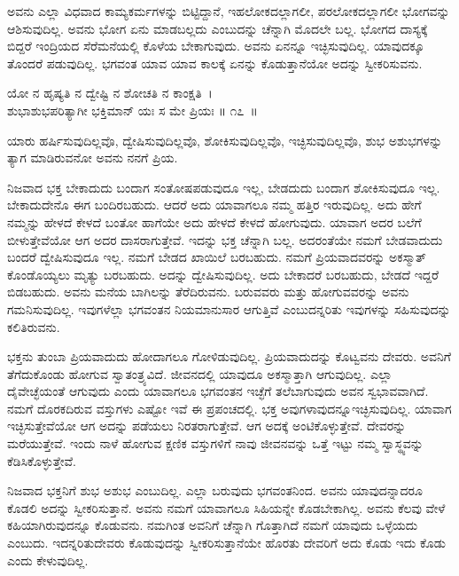 ಅವನು ಎಲ್ಲಾ ವಿಧವಾದ ಕಾಮ್ಯಕರ್ಮಗಳನ್ನು ಬಿಟ್ಟಿದ್ದಾನೆ, ಇಹಲೋಕದಲ್ಲಾಗಲೀ, ಪರ\-ಲೋಕದಲ್ಲಾಗಲೀ ಭೋಗವನ್ನು ಆಶಿಸುವುದಿಲ್ಲ. ಅವನು ಭೋಗ ಏನು ಮಾಡಬಲ್ಲದು ಎಂಬು\-ದನ್ನು ಚೆನ್ನಾಗಿ ಮೊದಲೇ ಬಲ್ಲ. ಭೋಗದ ದಾಸ್ಯಕ್ಕೆ ಬಿದ್ದರೆ ಇಂದ್ರಿಯದ ಸೆರೆಮನೆಯಲ್ಲಿ ಕೊಳೆಯ ಬೇಕಾಗುವುದು. ಅವನು ಏನನ್ನೂ ಇಚ್ಛಿಸುವುದಿಲ್ಲ. ಯಾವುದಕ್ಕೂ ತೊಂದರೆ ಪಡುವುದಿಲ್ಲ. ಭಗವಂತ ಯಾವ ಯಾವ ಕಾಲಕ್ಕೆ ಏನನ್ನು ಕೊಡುತ್ತಾನೆಯೋ ಅದನ್ನು ಸ್ವೀಕರಿಸುವನು.

\begin{shloka}
ಯೋ ನ ಹೃಷ್ಯತಿ ನ ದ್ವೇಷ್ಟಿ ನ ಶೋಚತಿ ನ ಕಾಂಕ್ಷತಿ~।\\ಶುಭಾಶುಭಪರಿತ್ಯಾಗೀ ಭಕ್ತಿಮಾನ್ ಯಃ ಸ ಮೇ ಪ್ರಿಯಃ \hfill॥ ೧೭~॥
\end{shloka}

\begin{artha}
ಯಾರು ಹರ್ಷಿಸುವುದಿಲ್ಲವೊ, ದ್ವೇಷಿಸುವುದಿಲ್ಲವೊ, ಶೋಕಿಸುವುದಿಲ್ಲವೊ, ಇಚ್ಛಿಸುವುದಿಲ್ಲವೊ, ಶುಭ ಅಶುಭಗಳನ್ನು ತ್ಯಾಗ ಮಾಡಿರುವನೋ ಅವನು ನನಗೆ ಪ್ರಿಯ.
\end{artha}

ನಿಜವಾದ ಭಕ್ತ ಬೇಕಾದುದು ಬಂದಾಗ ಸಂತೋಷಪಡುವುದೂ ಇಲ್ಲ, ಬೇಡದುದು ಬಂದಾಗ ಶೋಕಿಸುವುದೂ ಇಲ್ಲ. ಬೇಕಾದುದೇನೊ ಈಗ ಬಂದಿರಬಹುದು. ಆದರೆ ಅದು ಯಾವಾಗಲೂ ನಮ್ಮ ಹತ್ತಿರ ಇರುವುದಿಲ್ಲ. ಅದು ಹೇಗೆ ನಮ್ಮನ್ನು ಹೇಳದೆ ಕೇಳದೆ ಬಂತೋ ಹಾಗೆಯೇ ಅದು ಹೇಳದೆ ಕೇಳದೆ ಹೋಗುವುದು. ಯಾವಾಗ ಅದರ ಬಲೆಗೆ ಬೀಳುತ್ತೇವೆಯೋ ಆಗ ಅದರ ದಾಸರಾಗುತ್ತೇವೆ. ಇದನ್ನು ಭಕ್ತ ಚೆನ್ನಾಗಿ ಬಲ್ಲ. ಅದರಂತೆಯೇ ನಮಗೆ ಬೇಡವಾದುದು ಬಂದರೆ ದ್ವೇಷಿಸುವುದೂ ಇಲ್ಲ. ನಮಗೆ ಬೇಡದ ಖಾಯಿಲೆ ಬರಬಹುದು. ನಮಗೆ ಪ್ರಿಯವಾದವರನ್ನು ಅಕಸ್ಮಾತ್ ಕೊಂಡೊಯ್ಯಲು ಮೃತ್ಯು ಬರಬಹುದು. ಅದನ್ನು ದ್ವೇಷಿಸುವುದಿಲ್ಲ. ಅದು ಬೇಕಾದರೆ ಬರಬಹುದು, ಬೇಡದೆ ಇದ್ದರೆ ಬಿಡಬಹುದು. ಅವನು ಮನೆಯ ಬಾಗಿಲನ್ನು ತೆರೆದಿರುವನು. ಬರುವವರು ಮತ್ತು ಹೋಗುವವರನ್ನು ಅವನು ಗಮನಿಸುವುದಿಲ್ಲ. ಇವುಗಳೆಲ್ಲಾ ಭಗವಂತನ ನಿಯಮಾನುಸಾರ ಆಗುತ್ತಿವೆ ಎಂಬುದನ್ನರಿತು ಇವುಗಳನ್ನು ಸಹಿಸುವುದನ್ನು ಕಲಿತಿರುವನು.

ಭಕ್ತನು ತುಂಬಾ ಪ್ರಿಯವಾದುದು ಹೋದಾಗಲೂ ಗೋಳಿಡುವುದಿಲ್ಲ. ಪ್ರಿಯವಾದುದನ್ನು ಕೊಟ್ವವನು ದೇವರು. ಅವನಿಗೆ ತೆಗೆದುಕೊಂಡು ಹೋಗುವ ಸ್ವಾತಂತ್ರ್ಯವಿದೆ. ಜೀವನದಲ್ಲಿ ಯಾವುದೂ ಅಕಸ್ಮಾತ್ತಾಗಿ ಆಗುವುದಿಲ್ಲ. ಎಲ್ಲಾ ದೈವೇಚ್ಛೆಯಂತೆ ಆಗುವುದು ಎಂದು ಯಾವಾಗಲೂ ಭಗವಂತನ ಇಚ್ಛೆಗೆ ತಲೆಬಾಗುವುದು ಅವನ ಸ್ವಭಾವವಾಗಿದೆ. ನಮಗೆ ದೊರಕ\-ದಿರುವ ವಸ್ತುಗಳು ಎಷ್ಟೋ ಇವೆ ಈ ಪ್ರಪಂಚದಲ್ಲಿ. ಭಕ್ತ ಅವುಗಳಾವುದನ್ನೂಇಚ್ಛಿಸುವುದಿಲ್ಲ. ಯಾವಾಗ ಇಚ್ಛಿಸುತ್ತೇವೆಯೋ ಆಗ ಅದನ್ನು ಪಡೆಯಲು ನಿರತರಾಗುತ್ತೇವೆ. ಆಗ ಅದಕ್ಕೆ ಅಂಟಿಕೊಳ್ಳುತ್ತೇವೆ. ದೇವರನ್ನು ಮರೆಯುತ್ತೇವೆ. ಇಂದು ನಾಳೆ ಹೋಗುವ ಕ್ಷಣಿಕ ವಸ್ತುಗಳಿಗೆ ನಾವು ಜೀವನವನ್ನು ಒತ್ತೆ ಇಟ್ಟು ನಮ್ಮ ಸ್ವಾಸ್ಥ್ಯವನ್ನು ಕೆಡಿಸಿಕೊಳ್ಳುತ್ತೇವೆ.

ನಿಜವಾದ ಭಕ್ತನಿಗೆ ಶುಭ ಅಶುಭ ಎಂಬುದಿಲ್ಲ. ಎಲ್ಲಾ ಬರುವುದು ಭಗವಂತನಿಂದ. ಅವನು ಯಾವುದನ್ನಾದರೂ ಕೊಡಲಿ ಅದನ್ನು ಸ್ವೀಕರಿಸುತ್ತಾನೆ. ಅವನು ನಮಗೆ ಯಾವಾಗಲೂ ಸಿಹಿಯನ್ನೇ ಕೊಡಬೇಕಾಗಿಲ್ಲ. ಅವನು ಕೆಲವು ವೇಳೆ ಕಹಿಯಾಗಿರುವುದನ್ನೂ ಕೊಡುವನು. ನಮಗಿಂತ ಅವನಿಗೆ ಚೆನ್ನಾಗಿ ಗೊತ್ತಾಗಿದೆ ನಮಗೆ ಯಾವುದು ಒಳ್ಳೆಯದು ಎಂಬುದು. ಇದನ್ನರಿತು\break ದೇವರು ಕೊಡುವುದನ್ನು ಸ್ವೀಕರಿಸುತ್ತಾನೆಯೇ ಹೊರತು ದೇವರಿಗೆ ಅದು ಕೊಡು ಇದು ಕೊಡು ಎಂದು ಕೇಳುವುದಿಲ್ಲ.

